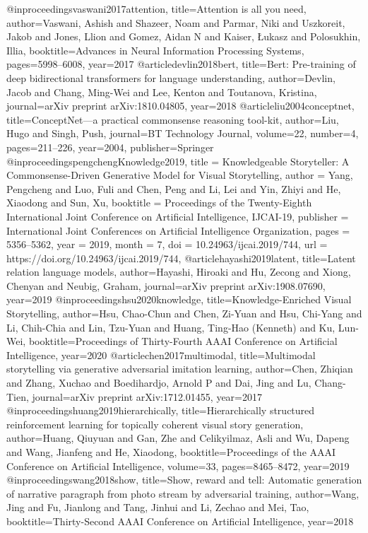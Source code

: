 @inproceedings{vaswani2017attention,
  title={Attention is all you need},
  author={Vaswani, Ashish and Shazeer, Noam and Parmar, Niki and Uszkoreit, Jakob and Jones, Llion and Gomez, Aidan N and Kaiser, {\L}ukasz and Polosukhin, Illia},
  booktitle={Advances in Neural Information Processing Systems},
  pages={5998--6008},
  year={2017}
}
@article{devlin2018bert,
  title={Bert: Pre-training of deep bidirectional transformers for language understanding},
  author={Devlin, Jacob and Chang, Ming-Wei and Lee, Kenton and Toutanova, Kristina},
  journal={arXiv preprint arXiv:1810.04805},
  year={2018}
}
@article{liu2004conceptnet,
  title={{ConceptNet}---a practical commonsense reasoning tool-kit},
  author={Liu, Hugo and Singh, Push},
  journal={BT Technology Journal},
  volume={22},
  number={4},
  pages={211--226},
  year={2004},
  publisher={Springer}
}
@inproceedings{pengchengKnowledge2019,
  title     = {Knowledgeable {S}toryteller: A Commonsense-Driven Generative Model for Visual Storytelling},
  author    = {Yang, Pengcheng and Luo, Fuli and Chen, Peng and Li, Lei and Yin, Zhiyi and He, Xiaodong and Sun, Xu},
  booktitle = {Proceedings of the Twenty-Eighth International Joint Conference on
               Artificial Intelligence, {IJCAI-19}},
  publisher = {International Joint Conferences on Artificial Intelligence Organization},             
  pages     = {5356--5362},
  year      = {2019},
  month     = {7},
  doi       = {10.24963/ijcai.2019/744},
  url       = {https://doi.org/10.24963/ijcai.2019/744},
}
@article{hayashi2019latent,
  title={Latent relation language models},
  author={Hayashi, Hiroaki and Hu, Zecong and Xiong, Chenyan and Neubig, Graham},
  journal={arXiv preprint arXiv:1908.07690},
  year={2019}
}
@inproceedings{hsu2020knowledge,
  title={Knowledge-Enriched Visual Storytelling},
  author={Hsu, Chao-Chun and Chen, Zi-Yuan and Hsu, Chi-Yang and Li, Chih-Chia and Lin, Tzu-Yuan and Huang, Ting-Hao (Kenneth) and Ku, Lun-Wei},
  booktitle={Proceedings of Thirty-Fourth AAAI Conference on Artificial Intelligence},
  year={2020}
}
@article{chen2017multimodal,
  title={Multimodal storytelling via generative adversarial imitation learning},
  author={Chen, Zhiqian and Zhang, Xuchao and Boedihardjo, Arnold P and Dai, Jing and Lu, Chang-Tien},
  journal={arXiv preprint arXiv:1712.01455},
  year={2017}
}
@inproceedings{huang2019hierarchically,
  title={Hierarchically structured reinforcement learning for topically coherent visual story generation},
  author={Huang, Qiuyuan and Gan, Zhe and Celikyilmaz, Asli and Wu, Dapeng and Wang, Jianfeng and He, Xiaodong},
  booktitle={Proceedings of the AAAI Conference on Artificial Intelligence},
  volume={33},
  pages={8465--8472},
  year={2019}
}
@inproceedings{wang2018show,
  title={Show, reward and tell: Automatic generation of narrative paragraph from photo stream by adversarial training},
  author={Wang, Jing and Fu, Jianlong and Tang, Jinhui and Li, Zechao and Mei, Tao},
  booktitle={Thirty-Second AAAI Conference on Artificial Intelligence},
  year={2018}
}

